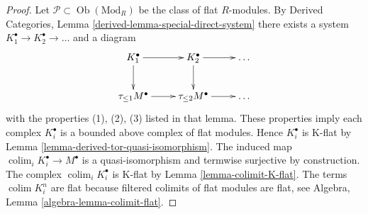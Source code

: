\documentclass[10pt,a4paper]{amsart}
\theoremstyle{plain}
\theoremstyle{definition}
\theoremstyle{remark}
\numberwithin{equation}{subsection}
\def\colim{\mathop{\mathrm{colim}}\nolimits}
\def\Ob{\mathop{\mathrm{Ob}}\nolimits}
\begin{document}
\begin{proof}
Let $\mathcal{P} \subset \Ob(\text{Mod}_R)$ be the
class of flat $R$-modules. By
Derived Categories, Lemma \ref{derived-lemma-special-direct-system}
there exists a system
$K_1^\bullet \to K_2^\bullet \to \ldots$
and a diagram
$$
\xymatrix{
K_1^\bullet \ar[d] \ar[r] &
K_2^\bullet \ar[d] \ar[r] & \ldots \\
\tau_{\leq 1}M^\bullet \ar[r] &
\tau_{\leq 2}M^\bullet \ar[r] & \ldots
}
$$
with the properties (1), (2), (3) listed in that lemma.
These properties imply each complex $K_i^\bullet$ is a bounded
above complex of flat modules. Hence $K_i^\bullet$ is K-flat by
Lemma \ref{lemma-derived-tor-quasi-isomorphism}.
The induced map $\colim_i K_i^\bullet \to M^\bullet$
is a quasi-isomorphism and termwise surjective by construction. The complex
$\colim_i K_i^\bullet$ is K-flat by
Lemma \ref{lemma-colimit-K-flat}.
The terms $\colim K_i^n$ are flat because filtered colimits of
flat modules are flat, see
Algebra, Lemma \ref{algebra-lemma-colimit-flat}.
\end{proof}
\end{document}
